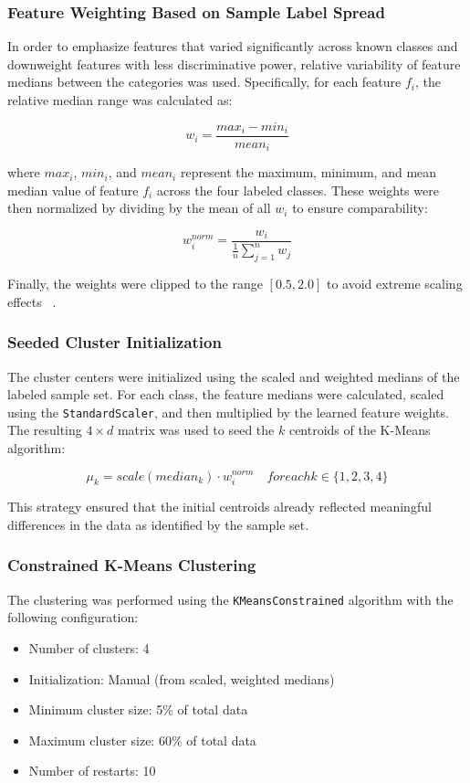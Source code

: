 \documentclass[a4paper,12pt,twoside]{scrreprt}
\begin{document}
\subsubsection{Feature Weighting Based on Sample Label Spread}

In order to emphasize features that varied significantly across known classes
and downweight features with less discriminative power, relative variability of
feature medians between the categories was used. Specifically, for each feature
$f_i$, the relative median range was calculated as:

\[
  w_i = \frac{max_i - min_i}{mean_i}
\]

where $max_i$, $min_i$, and $mean_i$ represent the
maximum, minimum, and mean median value of feature $f_i$ across the four
labeled classes. These weights were then normalized by dividing by the mean of
all $w_i$ to ensure comparability:

\[
  w_i^{norm} = \frac{w_i}{\frac{1}{n}\sum_{j=1}^n w_j}
\]

Finally, the weights were clipped to the range $[0.5, 2.0]$ to avoid extreme
scaling effects ~\cite{guyon_introduction_nodate}.

\subsubsection{Seeded Cluster Initialization}

The cluster centers were initialized using the scaled and weighted medians of
the labeled sample set. For each class, the feature medians were calculated,
scaled using the \texttt{StandardScaler}, and then multiplied by the learned
feature weights. The resulting $4 \times d$ matrix was used to seed the $k$
centroids of the K-Means algorithm:

\[
  \mu_k = scale(median_k) \cdot w_i^{norm}
  \quad for each k \in \{1, 2, 3, 4\}
\]

This strategy ensured that the initial centroids already reflected meaningful
differences in the data as identified by the sample set.

\subsubsection{Constrained K-Means Clustering}

The clustering was performed using the \texttt{KMeansConstrained} algorithm
with the following configuration:

\begin{itemize}
  \item Number of clusters: 4
  \item Initialization: Manual (from scaled, weighted medians)
  \item Minimum cluster size: 5\% of total data
  \item Maximum cluster size: 60\% of total data
  \item Number of restarts: 10
\end{itemize}
\end{document}
